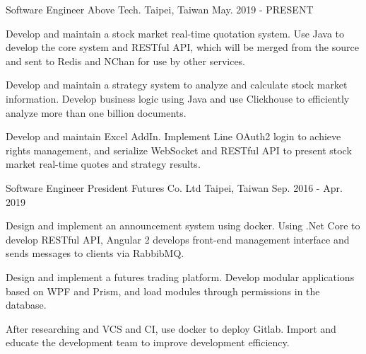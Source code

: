 

\begin{cventries}

  \cventry
    {Software Engineer} %
    {Above Tech.} %
    {Taipei, Taiwan} %
    {May. 2019 - PRESENT} %
    {
      \begin{cvitems} %
        \item {Develop and maintain a stock market real-time quotation system. Use Java to develop the core system and RESTful API, which will be merged from the source and sent to Redis and NChan for use by other services.}
        \item {Develop and maintain a strategy system to analyze and calculate stock market information. Develop business logic using Java and use Clickhouse to efficiently analyze more than one billion documents.}
        \item {Develop and maintain Excel AddIn. Implement Line OAuth2 login to achieve rights management, and serialize WebSocket and RESTful API to present stock market real-time quotes and strategy results.}
      \end{cvitems}
    }

  \cventry
    {Software Engineer} %
    {President Futures Co. Ltd} %
    {Taipei, Taiwan} %
    {Sep. 2016 - Apr. 2019} %
    {
      \begin{cvitems} %
        \item {Design and implement an announcement system using docker. Using .Net Core to develop RESTful API, Angular 2 develops front-end management interface and sends messages to clients via RabbibMQ.}
        \item {Design and implement a futures trading platform. Develop modular applications based on WPF and Prism, and load modules through permissions in the database.}
        \item {After researching and VCS and CI, use docker to deploy Gitlab. Import and educate the development team to improve development efficiency.}
      \end{cvitems}
    }

\end{cventries}
